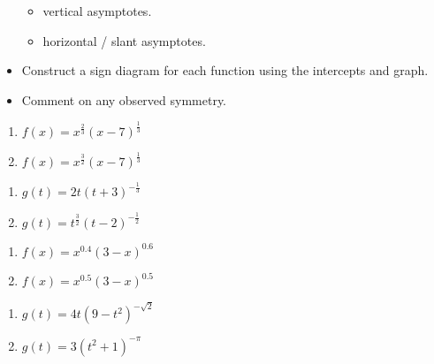 \documentclass{ximera}
\begin{document}
\begin{itemize}
\begin{multicols}{2}
\begin{itemize}
\item  vertical asymptotes.

\item  horizontal / slant asymptotes.

\end{itemize}

\end{multicols}

\item Construct a sign diagram for each function using the intercepts and graph.

\item  Comment on any observed symmetry.


\end{itemize}


\begin{multicols}{2}
\begin{enumerate}
\setcounter{enumi}{\value{HW}}

\item $f(x) = x^{\frac{2}{3}}(x - 7)^{\frac{1}{3}}$  \label{powerfcngraphexfirst}
\item $f(x) = x^{\frac{3}{2}}(x - 7)^{\frac{1}{3}}$ 


\setcounter{HW}{\value{enumi}}
\end{enumerate}
\end{multicols}

\begin{multicols}{2}
\begin{enumerate}
\setcounter{enumi}{\value{HW}}

\item $g(t) = 2t(t+3)^{-\frac{1}{3}}$ 
\item $g(t) = t^{\frac{3}{2}}(t-2)^{-\frac{1}{2}}$ 


\setcounter{HW}{\value{enumi}}
\end{enumerate}
\end{multicols}

\begin{multicols}{2}
\begin{enumerate}
\setcounter{enumi}{\value{HW}}

\item $f(x) = x^{0.4} (3-x)^{0.6}$ 
\item $f(x) = x^{0.5} (3-x)^{0.5}$ 


\setcounter{HW}{\value{enumi}}
\end{enumerate}
\end{multicols}

\begin{multicols}{2}
\begin{enumerate}
\setcounter{enumi}{\value{HW}}

\item $g(t) = 4t (9-t^2)^{-\sqrt{2}}$ 
\item $g(t) = 3(t^2+1)^{-\pi}$  \label{powerfcngraphexlast}


\setcounter{HW}{\value{enumi}}
\end{enumerate}
\end{multicols}
\end{document}
